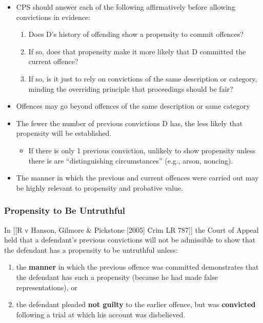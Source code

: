 \documentclass[
]{article}
\providecommand{\tightlist}{%
  \setlength{\itemsep}{0pt}\setlength{\parskip}{0pt}}
\begin{document}
\begin{itemize}
\tightlist
\item
  CPS should answer each of the following affirmatively before allowing
  convictions in evidence:

  \begin{enumerate}
  \def\labelenumi{\arabic{enumi}.}
  \tightlist
  \item
    Does D's history of offending show a propensity to commit offences?
  \item
    If so, does that propensity make it more likely that D committed the
    current offence?
  \item
    If so, is it just to rely on convictions of the same description or
    category, minding the overriding principle that proceedings should
    be fair?
  \end{enumerate}
\item
  Offences may go beyond offences of the same description or same
  category
\item
  The fewer the number of previous convictions D has, the less likely
  that propensity will be established.

  \begin{itemize}
  \tightlist
  \item
    If there is only 1 previous conviction, unlikely to show propensity
    unless there is are ``distinguishing circumstances'' (e.g., arson,
    noncing).
  \end{itemize}
\item
  The manner in which the previous and current offences were carried out
  may be highly relevant to propensity and probative value.
\end{itemize}

\hypertarget{propensity-to-be-untruthful}{%
\subsubsection{Propensity to Be
Untruthful}\label{propensity-to-be-untruthful}}

In {[}{[}R v Hanson, Gilmore \& Pickstone {[}2005{]} Crim LR 787{]}{]}
the Court of Appeal held that a defendant's previous convictions will
not be admissible to show that the defendant has a propensity to be
untruthful unless:

\begin{enumerate}
\def\labelenumi{\arabic{enumi}.}
\tightlist
\item
  the \textbf{manner} in which the previous offence was committed
  demonstrates that the defendant has such a propensity (because he had
  made false representations), or
\item
  the defendant pleaded \textbf{not guilty} to the earlier offence, but
  was \textbf{convicted} following a trial at which his account was
  disbelieved.
\end{enumerate}
\end{document}
